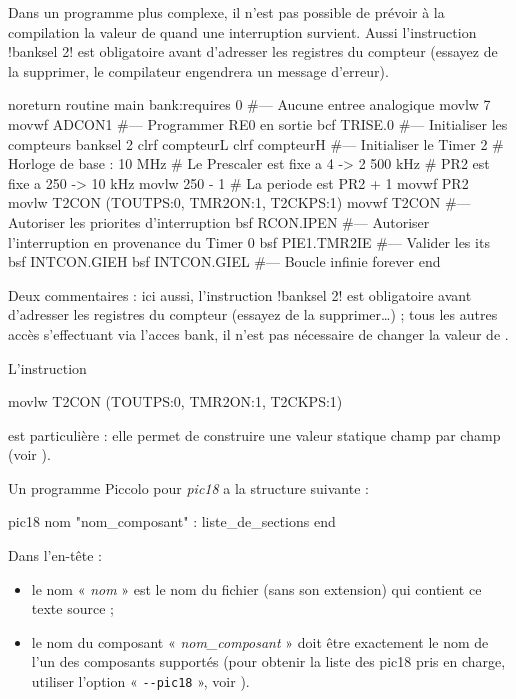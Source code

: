 Dans un programme plus complexe, il n’est pas possible de prévoir à la compilation la valeur de  quand une interruption survient. Aussi l’instruction \pic!banksel 2! est obligatoire avant d’adresser les registres du compteur (essayez de la supprimer, le compilateur engendrera un message d'erreur).

\begin{piccolo}
noreturn routine main bank:requires 0 {
#--- Aucune entree analogique
  movlw 7
  movwf ADCON1
#--- Programmer RE0 en sortie
  bcf  TRISE.0
#--- Initialiser les compteurs
  banksel 2
  clrf compteurL
  clrf compteurH
#--- Initialiser le Timer 2
#  Horloge de base : 10 MHz
#  Le Prescaler est fixe a 4 -> 2 500 kHz
#  PR2 est fixe a 250 -> 10 kHz
  movlw  250 - 1 # La periode est PR2 + 1
  movwf  PR2
  movlw  T2CON (TOUTPS:0, TMR2ON:1, T2CKPS:1)
  movwf  T2CON  
#--- Autoriser les priorites d'interruption
  bsf  RCON.IPEN
#--- Autoriser l'interruption en provenance du Timer 0
  bsf  PIE1.TMR2IE
#--- Valider les its
  bsf  INTCON.GIEH
  bsf  INTCON.GIEL
#--- Boucle infinie
  forever
  end
}
\end{piccolo}

Deux commentaires : ici aussi, l’instruction \pic!banksel 2! est obligatoire avant d’adresser les registres du compteur (essayez de la supprimer…) ; tous les autres accès s’effectuant via l’acces bank, il n’est pas nécessaire de changer la valeur de .

L’instruction
\begin{piccolo}
  movlw  T2CON (TOUTPS:0, TMR2ON:1, T2CKPS:1)
\end{piccolo}
est particulière : elle permet de construire une valeur statique champ par champ (voir ).








Un programme Piccolo pour \emph{pic18} a la structure suivante :

\begin{piccolo}
pic18 nom "nom_composant" :
  liste_de_sections
end
\end{piccolo}


Dans l’en-tête :
\begin{itemize}
  \item le nom « \emph{nom} » est le nom du fichier (sans son extension) qui contient ce texte source ;
  \item le nom du composant « \emph{nom\_composant} » doit être exactement le nom de l’un des composants supportés (pour obtenir la liste des pic18 pris en charge, utiliser l’option « \texttt{-{}-pic18} », voir ).
\end{itemize}


